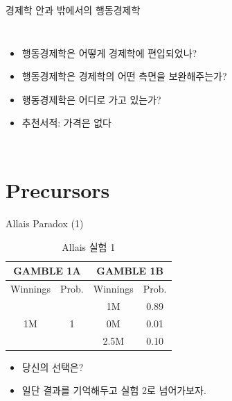 \documentclass[final]{beamer}
\begin{document}
\begin{frame}[t]{경제학 안과 밖에서의 행동경제학}
	\begin{columns}
		\begin{itemize}
			\item 행동경제학은 어떻게 경제학에 편입되었나?
			\item 행동경제학은 경제학의 어떤 측면을 보완해주는가?
			\item 행동경제학은 어디로 가고 있는가?
			\item 추천서적: 가격은 없다
		\end{itemize}
	\end{columns}
	
\end{frame}


\section{Precursors} %
\label{sec:precursors}

\begin{frame}[t]{Allais Paradox (1)}
	\begin{table} 
	\setlength{\tabcolsep}{1.2em}
	\begin{tabular}{|c|c||c|c|} \hline
	\multicolumn{2}{|c||}{GAMBLE 1A}&\multicolumn{2}{c|}{GAMBLE 1B} \\ \hline
	Winnings & Prob. & Winnings & Prob. \\ \hline
	\multirow{3}[2]{*}{1M} & \multirow{3}[2]{*}{1} & 1M & 0.89 \\ \cline{3-4}
	& & 0M & 0.01 \\  \cline{3-4}
	& & 2.5M & 0.10 \\  \hline
	\end{tabular}
	\caption{Allais 실험 1}\label{tab:01}
	\end{table}
	\begin{itemize}
		\item 당신의 선택은? 
		\item 일단 결과를 기억해두고 실험 2로 넘어가보자. 
	\end{itemize}
\end{frame}
\end{document}
